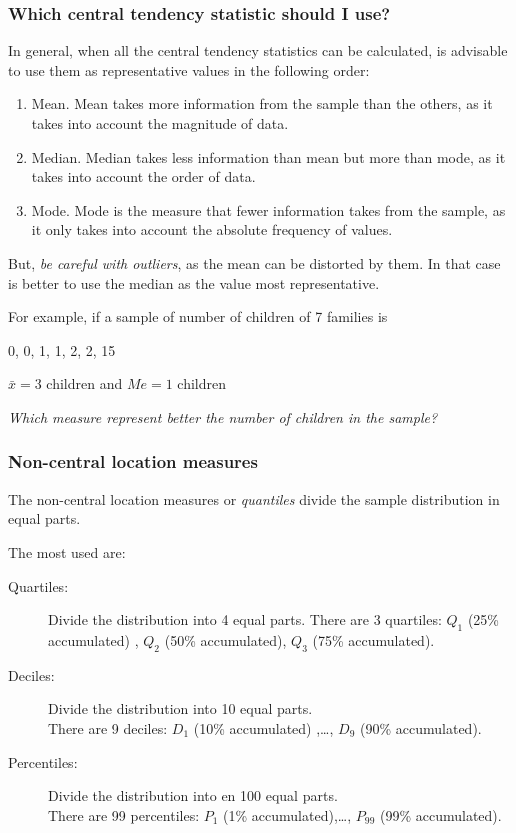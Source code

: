 \begin{frame}
\frametitle{Which central tendency statistic should I use?}
In general, when all the central tendency statistics can be calculated, is advisable to use them as representative
values in the following order:
\begin{enumerate}
\item Mean. Mean takes more information from the sample than the others, as it takes into account the magnitude
of data.
\item Median. Median takes less information than mean but more than mode, as it takes into account the order
of data.
\item Mode. Mode is the measure that fewer information takes from the sample, as it only takes into account the
absolute frequency of values.
\end{enumerate}

But, \emph{be careful with outliers}, as the mean can be distorted by them.
In that case is better to use the median as the value most representative.

For example, if a sample of number of children of 7 families is
\begin{center}
0, 0, 1, 1, 2, 2, 15

$\bar{x}=3$ children \quad and \quad $Me=1$ children

\emph{Which measure represent better the number of children in the sample?}
\end{center}
\end{frame}


\begin{frame}
\frametitle{Non-central location measures}
The non-central location measures or \emph{quantiles} divide the sample distribution in equal parts.

The most used are:
\begin{description}
\item[Quartiles:] Divide the distribution into 4 equal parts. 
There are 3 quartiles: $Q_1$ (25\% accumulated) , $Q_2$ (50\% accumulated), $Q_3$ (75\% accumulated).
\item[Deciles:] Divide the distribution into 10 equal parts.\\
There are 9 deciles: $D_1$ (10\% accumulated) ,\ldots, $D_9$ (90\% accumulated).
\item[Percentiles:] Divide the distribution into en 100 equal parts.\\
There are 99 percentiles: $P_1$ (1\% accumulated),\ldots, $P_{99}$ (99\% accumulated).
\end{description}
\end{frame}


